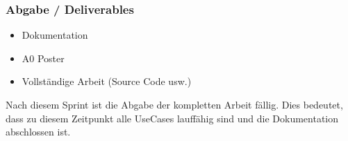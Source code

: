 \subsubsection{Abgabe / Deliverables}
\begin{itemize}
	\item Dokumentation
	\item A0 Poster
	\item Vollständige Arbeit (Source Code usw.)
\end{itemize}

Nach diesem Sprint ist die Abgabe der kompletten Arbeit fällig. Dies bedeutet, dass zu diesem Zeitpunkt alle UseCases lauffähig sind und die Dokumentation abschlossen ist. 